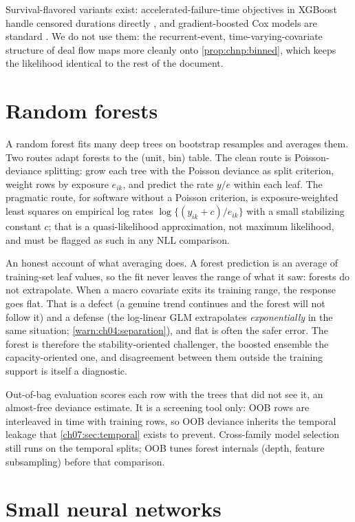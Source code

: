Survival-flavored variants exist: accelerated-failure-time objectives in
XGBoost handle censored durations directly \citep{barnwal2022}, and
gradient-boosted Cox models are standard \citep{polsterl2020}. We do not
use them: the recurrent-event, time-varying-covariate structure of deal
flow maps more cleanly onto \cref{prop:chnp:binned}, which keeps the
likelihood identical to the rest of the document.

\section{Random forests}\label{chnp:sec:forests}

A random forest fits many deep trees on bootstrap resamples and averages
them. Two routes adapt forests to the (unit, bin) table. The clean route
is Poisson-deviance splitting: grow each tree with the Poisson deviance
as split criterion, weight rows by exposure $e_{ik}$, and predict the
rate $y/e$ within each leaf. The pragmatic route, for software without a
Poisson criterion, is exposure-weighted least squares on empirical log
rates $\log\{(y_{ik} + c)/e_{ik}\}$ with a small stabilizing constant
$c$; that is a quasi-likelihood approximation, not maximum likelihood,
and must be flagged as such in any NLL comparison.

An honest account of what averaging does. A forest prediction is an
average of training-set leaf values, so the fit never leaves the range
of what it saw: forests do not extrapolate. When a macro covariate exits
its training range, the response goes flat. That is a defect (a genuine
trend continues and the forest will not follow it) and a defense (the
log-linear GLM extrapolates \emph{exponentially} in the same situation;
\cref{warn:ch04:separation}), and flat is often the safer error. The
forest is therefore the stability-oriented challenger, the boosted
ensemble the capacity-oriented one, and disagreement between them
outside the training support is itself a diagnostic.

Out-of-bag evaluation scores each row with the trees that did not see
it, an almost-free deviance estimate. It is a screening tool only: OOB
rows are interleaved in time with training rows, so OOB deviance
inherits the temporal leakage that \cref{ch07:sec:temporal} exists to
prevent. Cross-family model selection still runs on the temporal splits;
OOB tunes forest internals (depth, feature subsampling) before that
comparison.

\section{Small neural networks}\label{chnp:sec:nets}

